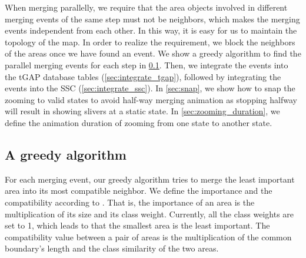 \documentclass{ica}
\begin{document}

When merging parallelly,
we require that 
the area objects involved in different merging events of the same step 
must not be neighbors, 
which makes the merging events independent from each other.
In this way, it is easy for us to maintain the topology of the map.
In order to realize the requirement,
we block the neighbors of the areas once we have found an event.
We show a greedy algorithm to find the parallel merging events for each step
in \sect\ref{sec:greedy_algo}.
Then, we integrate the events into the tGAP database tables
(\sect\ref{sec:integrate_tgap}),
followed by integrating the events into the SSC 
(\sect\ref{sec:integrate_ssc}).
In \sect\ref{sec:snap}, we show how to snap the zooming to valid states
to avoid half-way merging animation 
as stopping halfway will result in showing slivers at a static state.
In \sect\ref{sec:zooming_duration}, we define 
the animation duration of zooming from one state to another state.


\subsection{A greedy algorithm}
\label{sec:greedy_algo}

For each merging event, our greedy algorithm tries to 
merge the least important area into its most compatible neighbor.
We define the importance and the compatibility according to
\citet{vanPutten1998NewGAP}.
That is, the importance of an area is the multiplication 
of its size and its class weight.
Currently, all the class weights are set to 1,
which leads to that the smallest area is the least important.
The compatibility value between a pair of areas is 
the multiplication of the common boundary's length and 
the class similarity of the two areas.
\end{document}
